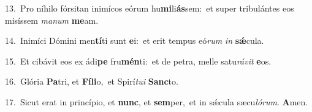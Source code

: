{\numbfont\textcolor{\numbcolor}{13.}}~Pro níhilo fórsitan inimícos eórum hu\-\textbf{mi}\-li\-\textbf{ás}\-sem:~\star et super tribulántes eos misíssem \textit{ma}\-\textit{num} \textbf{me}\-am.\par
{\numbfont\textcolor{\numbcolor}{14.}}~Inimíci Dómini men\-\textbf{tí}\-ti sunt \textbf{e}\-i:~\star et erit tempus eó\textit{rum} \textit{in} \textbf{sǽ}\-cula.\par
{\numbfont\textcolor{\numbcolor}{15.}}~Et cibávit eos ex ádi\textbf{pe} fru\-\textbf{mén}\-ti:~\star et de petra, melle satu\-\textit{rá}\-\textit{vit} \textbf{e}\-os.\par
{\numbfont\textcolor{\numbcolor}{16.}}~Glória \textbf{Pa}\-tri, et \textbf{Fí}\-\textbf{li}o,~\star et Spirí\-\textit{tu}\-\textit{i} \textbf{Sanc}\-to.\par
{\numbfont\textcolor{\numbcolor}{17.}}~Sicut erat in princípio, et \textbf{nunc}\-, et \textbf{sem}\-per,~\star et in sǽcula sæcu\-\textit{ló}\-\textit{rum}. \textbf{A}\-men.\par
